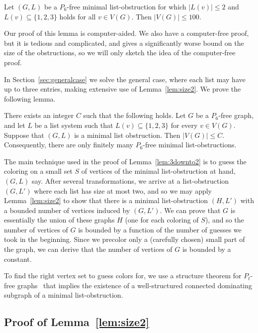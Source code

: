 \documentclass[11pt]{article}
\begin{document}
\begin{lemma}\label{lem:size2}
Let $(G,L)$ be a $P_6$-free minimal list-obstruction for which $|L(v)|\le 2$ and $L(v) \subseteq \{1,2,3\}$ holds for all $v \in V(G)$.
Then $|V(G)|\le 100$.
\end{lemma}

Our proof of this lemma is computer-aided.
We also have a computer-free proof, but it is tedious and complicated, and 
gives a significantly worse bound on the size of the obstructions, so we will only sketch the idea of the computer-free proof.

In Section~\ref{sec:generalcase} we solve the general case, where each list may have up to three entries, making extensive use of Lemma~\ref{lem:size2}.
We prove the following lemma.

\begin{lemma}\label{lem:3downto2}
There exists an integer $C$ such that the following holds. Let $G$ be a $P_6$-free graph, and let $L$ be a list system such that $L(v) \subseteq \{1,2,3\}$
for every $v \in V(G)$.
Suppose that $(G,L)$ is a minimal list obstruction. Then $|V(G)| \leq C$. Consequently,
there are only finitely many $P_6$-free minimal list-obstructions.
\end{lemma}

The main technique used  in the proof of Lemma~\ref{lem:3downto2} is to guess the coloring on a small set  $S$ of vertices of the minimal list-obstruction at hand, $(G,L)$ say.
After several transformations, we arrive at a list-obstruction $(G,L')$ where each list has size at most two, and so we may apply Lemma~\ref{lem:size2} to show that there is a minimal list-obstruction $(H,L')$ with a bounded number of vertices induced by $(G,L')$.
We can prove that $G$ is essentially the union of these graphs $H$ (one for each coloring of $S$), and so the number of vertices of $G$ is bounded by a function of the number of guesses we took in the beginning.
Since we precolor only a (carefully chosen) small part of the graph, we can derive that the number of vertices of $G$ is bounded by a constant.

To find the right vertex set to guess colors for, we use a structure theorem for $P_t$-free graphs~\cite{CS14} that implies the existence of a well-structured connected dominating subgraph of a minimal list-obstruction.

\subsection{Proof of Lemma~\ref{lem:size2}}\label{sec:size2}
\end{document}
